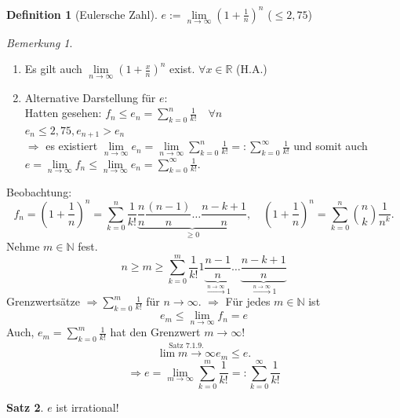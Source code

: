 \documentclass[12pt,a4paper,titlepage]{article} %
\theoremstyle{definition}
\newtheorem{satz}{Satz}[subsection]
\newtheorem{defi}[satz]{Definition}
\theoremstyle{remark}
\newtheorem*{bem}{Bemerkung}
\newcommand{\N}{\mathbb{N}}
\newcommand{\R}{\mathbb{R}}
\newcommand{\limes}[1]{\lim\limits_{#1\rightarrow\infty}}
\begin{document}
\begin{defi}[Eulersche Zahl]
	\( e:= \limes{n} (1+\frac{1}{n})^n \) (\(\leq 2,75\))
\end{defi}
\begin{bem}
	\begin{enumerate}
		\item Es gilt auch \( \limes{n} (1+\frac{x}{n})^n \) exist. \( \forall x\in\R \) (H.A.)
		\item Alternative Darstellung für \(e\):\\
		Hatten gesehen: \(f_n \leq e_n = \sum_{k=0}^{n} \frac{1}{k!} \quad \forall n \)\\
		\(e_n \leq 2,75, e_{n+1} > e_n \)\\
		\( \Rightarrow \) es existiert \( \limes{n} e_n = \limes{n} \sum_{k=0}^{n} \frac{1}{k!} =: \sum_{k=0}^{\infty} \frac{1}{k!} \) und somit auch \(e = \limes{n} f_n\leq \limes{n} e_n = \sum_{k=0}^{\infty} \frac{1}{k!} \).
	\end{enumerate}
	Beobachtung: 
	\[ f_n = \left(1+\frac{1}{n}\right)^n = \sum_{k=0}^{n} \frac{1}{k!} \underbrace{\frac{n}{n}\frac{(n-1)}{n} \ldots\frac{n-k+1}{n}}_{\geq 0} , \quad\left(1+\frac{1}{n}\right)^n = \sum_{k=0}^{n} \binom{n}{k} \frac{1}{n^k}. \]
	Nehme \(m\in\N\) fest.
	\[ n\geq m \geq \sum_{k=0}^{m} \frac{1}{k!} 1 \underbrace{\frac{n-1}{n}}_{\overset{n\rightarrow\infty}{\rightarrow} 1} \ldots \underbrace{\frac{n-k+1}{n}}_{\overset{n\rightarrow\infty}{\rightarrow} 1} \]
	Grenzwertsätze \(\Rightarrow \sum_{k=0}^{m} \frac{1}{k!} \) für \(n\rightarrow\infty\).
	\( \Rightarrow \) Für jedes \(m\in\N\) ist
	\[e_m \leq \limes{n} f_n = e \]
	Auch, \(e_m = \sum_{k=0}^{m} \frac{1}{k!} \) hat den Grenzwert \(m\rightarrow\infty\)!
	\[ \overset{\text{Satz 7.1.9.}}{\lim\limits{m\rightarrow\infty}} e_m \leq e. \]
	\[\Rightarrow e = \lim\limits_{m\rightarrow\infty} \sum_{k=0}^{m} \frac{1}{k!} =: \sum_{k=0}^{\infty} \frac{1}{k!} \]
\end{bem}
\begin{satz} 
	\(e\) ist irrational!
\end{satz}
\end{document}

